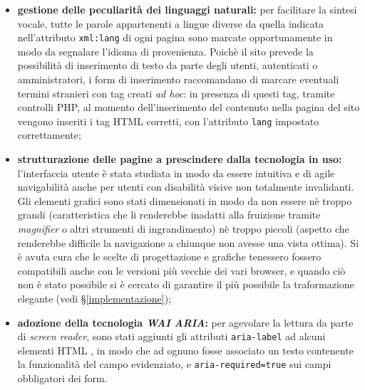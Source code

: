 \begin{itemize}
	\item \textbf{gestione delle peculiarità dei linguaggi naturali:} per facilitare la sintesi vocale, tutte le parole appartenenti a lingue diverse da quella indicata nell'attributo \texttt{xml:lang} di ogni pagina sono marcate opportunamente in modo da segnalare l'idioma di provenienza. Poichè il sito prevede la possibilità di inserimento di testo da parte degli utenti, autenticati o amministratori, i form di inserimento raccomandano di marcare eventuali termini stranieri con tag creati \textit{ad hoc}: in presenza di questi tag, tramite controlli PHP, al momento dell'inserimento del contenuto nella pagina del sito vengono inseriti i tag HTML corretti, con l'attributo \texttt{lang} impostato correttamente;
	
	\item \textbf{strutturazione delle pagine a prescindere dalla tecnologia in uso:} l'interfaccia utente è stata studiata in modo da essere intuitiva e di agile navigabilità anche per utenti con disabilità visive non totalmente invalidanti. Gli elementi grafici sono stati dimensionati in modo da non essere nè troppo grandi (caratteristica che li renderebbe inadatti alla fruizione tramite \textit{magnifier} o altri strumenti di ingrandimento) nè troppo piccoli (aspetto che renderebbe difficile la navigazione a chiunque non avesse una vista ottima). Si è avuta cura che le scelte di progettazione e grafiche tenessero fossero compatibili anche con le versioni più vecchie dei vari browser, e quando ciò non è stato possibile si è cercato di garantire il più possibile la traformazione elegante (vedi §\ref{implementazione});
	
	\item \textbf{adozione della tecnologia \textit{WAI ARIA}:} per agevolare la lettura da parte di \textit{screen reader}, sono stati aggiunti gli attributi \texttt{aria-label}  ad alcuni elementi HTML , in modo che ad ognuno fosse associato un testo contenente la funzionalità del campo evidenziato, e \texttt{aria-required=true} sui campi obbligatori dei form.
	

\end{itemize}
